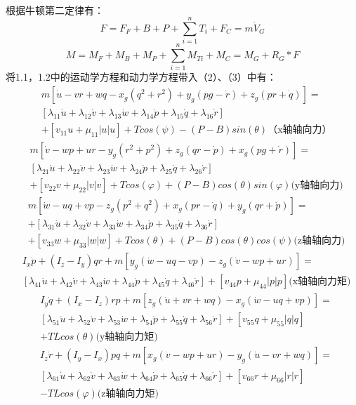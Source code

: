 \documentclass{ctexart}
\begin{document}
	\paragraph{}根据牛顿第二定律有：
	\begin{equation}
			F=F_F+B+P+\sum_{i=1}^nT_i+F_C=m\dot{V}_G
	\end{equation}
	\begin{equation}
			M=M_F+M_B+M_P+\sum_{i=1}^nM_{Ti}+M_C=M_G+R_G*F 
	\end{equation}
	将1.1，1.2中的运动学方程和动力学方程带入（2）、（3）中有：
	\begin{align*}
		&m[\dot{u}-vr+wq-x_g(q^2+r^2)+y_g(pg-\dot{r})+z_g(pr+\dot{q})]=  \\
		&[\lambda_{11}\dot{u}+\lambda_{12}\dot{v}+\lambda_{13}\dot{w}+\lambda_{14}\dot{p}+\lambda_{15}\dot{q}+\lambda_{16}\dot{r}] \\ 
		&+[v_{11}u+\mu_{11}|u|u]+Tcos(\psi)-(P-B)sin(\theta)\text{（x轴轴向力）}
	\end{align*}
	\begin{align*}
		&m[\dot{v}-wp+ur-y_g(r^2+p^2)+z_g(qr-\dot{p})+x_g(pg+\dot{r})]= \\
		&[\lambda_{21}\dot{u}+\lambda_{22}\dot{v}+\lambda_{23}\dot{w}+\lambda_{24}\dot{p}+\lambda_{25}\dot{q}+\lambda_{26}\dot{r}] \\
		&+[v_{22}v+\mu_{22}|v|v]+Tcos(\varphi)+(P-B)cos(\theta)sin(\varphi)\text{(y轴轴向力)}
	\end{align*}
	\begin{align*}
		&m[\dot{w}-uq+vp-z_g(p^2+q^2)+x_g(pr-\dot{q})+y_g(qr+\dot{p})]= \\
		&+[\lambda_{31}\dot{u}+\lambda_{32}\dot{v}+\lambda_{33}\dot{w}+\lambda_{34}\dot{p}+\lambda_{35}\dot{q}+\lambda_{36}\dot{r}] \\
		&+[v_{33}w+\mu_{33}|w|w]+Tcos(\theta)+(P-B)cos(\theta)cos(\psi)\text{(z轴轴向力)}
	\end{align*}
	\begin{align*}
		&I_x\dot{p}+(I_z-I_y)qr+m[y_g(\dot{w}-uq-vp)-z_g(\dot{v}-wp+ur)]= \\
		&[\lambda_{41}\dot{u}+\lambda_{42}\dot{v}+\lambda_{43}\dot{w}+\lambda_{44}\dot{p}+\lambda_{45}\dot{q}+\lambda_{46}\dot{r}]
		+[v_{44}p+\mu_{44}|p|p]\text{(x轴轴向力矩)}
	\end{align*}	
	\begin{align*}
		&I_y\dot{q}+(I_x-I_z)rp+m[z_g(\dot{u}+vr+wq)-x_g(\dot{w}-uq+vp)]= \\
		&[\lambda_{51}\dot{u}+\lambda_{52}\dot{v}+\lambda_{53}\dot{w}+\lambda_{54}\dot{p}+\lambda_{55}\dot{q}+\lambda_{56}\dot{r}] 
		+[v_{55}q+\mu_{55}|q|q] \\
		&+TLcos(\theta)\text{(y轴轴向力矩)}
	\end{align*}
	\begin{align*}
		&I_z\dot{r}+(I_y-I_x)pq+m[x_g(\dot{v}-wp+ur)-y_g(\dot{u}-vr+wq)]= \\
		&[\lambda_{61}\dot{u}+\lambda_{62}\dot{v}+\lambda_{63}\dot{w}+\lambda_{64}\dot{p}+\lambda_{65}\dot{q}+\lambda_{66}\dot{r}] 
		+[v_{66}r+\mu_{66}|r|r] \\
		&-TLcos(\varphi)\text{(z轴轴向力矩)}
	\end{align*}
\end{document}
